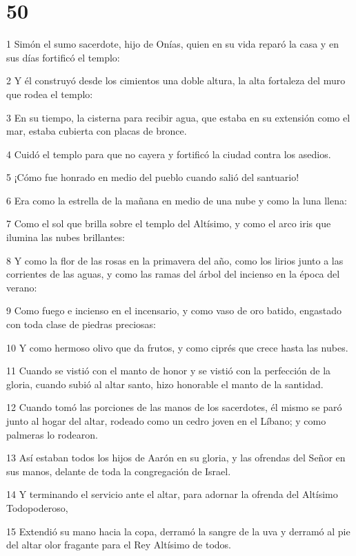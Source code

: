 \chapter{50}

\par 1 Simón el sumo sacerdote, hijo de Onías, quien en su vida reparó la casa y en sus días fortificó el templo:
\par 2 Y él construyó desde los cimientos una doble altura, la alta fortaleza del muro que rodea el templo:
\par 3 En su tiempo, la cisterna para recibir agua, que estaba en su extensión como el mar, estaba cubierta con placas de bronce.
\par 4 Cuidó el templo para que no cayera y fortificó la ciudad contra los asedios.
\par 5 ¡Cómo fue honrado en medio del pueblo cuando salió del santuario!
\par 6 Era como la estrella de la mañana en medio de una nube y como la luna llena:
\par 7 Como el sol que brilla sobre el templo del Altísimo, y como el arco iris que ilumina las nubes brillantes:
\par 8 Y como la flor de las rosas en la primavera del año, como los lirios junto a las corrientes de las aguas, y como las ramas del árbol del incienso en la época del verano:
\par 9 Como fuego e incienso en el incensario, y como vaso de oro batido, engastado con toda clase de piedras preciosas:
\par 10 Y como hermoso olivo que da frutos, y como ciprés que crece hasta las nubes.
\par 11 Cuando se vistió con el manto de honor y se vistió con la perfección de la gloria, cuando subió al altar santo, hizo honorable el manto de la santidad.
\par 12 Cuando tomó las porciones de las manos de los sacerdotes, él mismo se paró junto al hogar del altar, rodeado como un cedro joven en el Líbano; y como palmeras lo rodearon.
\par 13 Así estaban todos los hijos de Aarón en su gloria, y las ofrendas del Señor en sus manos, delante de toda la congregación de Israel.
\par 14 Y terminando el servicio ante el altar, para adornar la ofrenda del Altísimo Todopoderoso,
\par 15 Extendió su mano hacia la copa, derramó la sangre de la uva y derramó al pie del altar olor fragante para el Rey Altísimo de todos.
